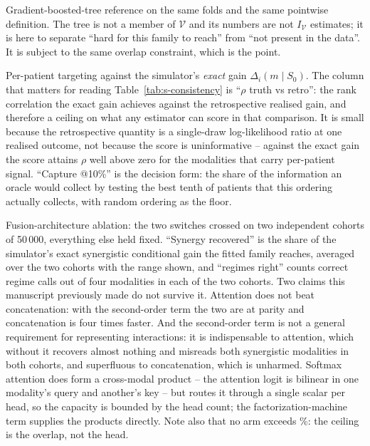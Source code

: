 \documentclass[11pt]{article}
\newcommand{\fittable}[1]{%
  \resizebox{\ifdim\width>\linewidth\linewidth\else\width\fi}{!}{#1}}
\theoremstyle{definition}
\theoremstyle{remark}
\newcommand{\Vc}{\mathcal{V}}
\newcommand{\IV}{I_{\Vc}}
\begin{document}
\begin{table}[htbp]\centering\small
\caption{Gradient-boosted-tree reference on the same folds and the same
pointwise definition. The tree is not a member of $\Vc$ and its numbers are not
$\IV$ estimates; it is here to separate ``hard for this family to reach'' from
``not present in the data''. It is subject to the same overlap constraint, which
is the point.}
\label{tab:s-tree}
\fittable{}
\end{table}

\begin{table}[htbp]\centering\small
\caption{Per-patient targeting against the simulator's \emph{exact} gain
$\Delta_i(m\mid S_0)$. The column that matters for reading
Table~\ref{tab:s-consistency} is ``$\rho$ truth vs retro'': the rank correlation
the exact gain achieves against the retrospective realised gain, and therefore a
ceiling on what any estimator can score in that comparison. It is small because
the retrospective quantity is a single-draw log-likelihood ratio at one realised
outcome, not because the score is uninformative -- against the exact gain the
score attains $\rho$ well above zero for the modalities that carry per-patient
signal. ``Capture @10\%'' is the decision form: the share of the information an
oracle would collect by testing the best tenth of patients that this ordering
actually collects, with random ordering as the floor.}
\label{tab:s-targeting}
\fittable{}
\end{table}

\begin{table}[htbp]\centering\small
\caption{Fusion-architecture ablation: the two switches crossed on two
independent cohorts of 50\,000, everything else held fixed. ``Synergy
recovered'' is the share of the simulator's exact synergistic conditional gain
the fitted family reaches, averaged over the two cohorts with the range shown,
and ``regimes right'' counts correct regime calls out of four modalities in each
of the two cohorts. Two claims this manuscript previously made do not survive
it. Attention does not beat concatenation: with the second-order term the two
are at parity and concatenation is four times faster. And the second-order term
is not a general requirement for representing interactions: it is indispensable
to attention, which without it recovers almost nothing and misreads both
synergistic modalities in both cohorts, and superfluous to concatenation, which
is unharmed. Softmax attention does form a cross-modal product -- the attention
logit is bilinear in one modality's query and another's key -- but routes it
through a single scalar per head, so the capacity is bounded by the head count;
the factorization-machine term supplies the products directly. Note also that no arm exceeds
\ablConcatFmSynHi\%: the ceiling is the overlap, not the head.}
\label{tab:s-ablation}
\fittable{}
\end{table}
\end{document}
